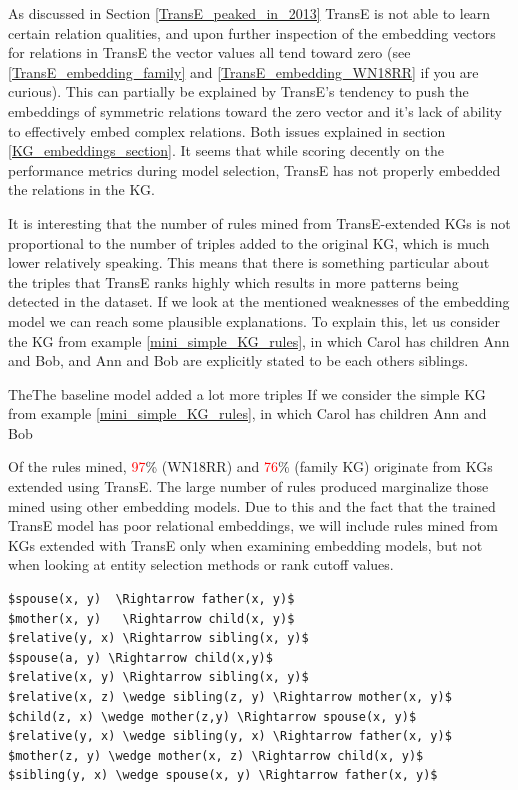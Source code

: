 As discussed in Section \ref{TransE_peaked_in_2013} TransE is not able to learn certain relation qualities, and upon further inspection of the embedding vectors for relations in TransE the vector values all tend toward zero (see \ref{TransE_embedding_family} and \ref{TransE_embedding_WN18RR} if you are curious). This can partially be explained by TransE's tendency to push the embeddings of symmetric relations toward the zero vector and it's lack of ability to effectively embed complex relations. Both issues explained in section \ref{KG_embeddings_section}. It seems that while scoring decently on the performance metrics during model selection, TransE has not properly embedded the relations in the KG. 

It is interesting that the number of rules mined from TransE-extended KGs is not proportional to the number of triples added to the original KG, which is much lower relatively speaking. This means that there is something particular about the triples that TransE ranks highly which results in more patterns being detected in the dataset. If we look at the mentioned weaknesses of the embedding model we can reach some plausible explanations. To explain this, let us consider the KG from example \ref{mini_simple_KG_rules}, in which Carol has children Ann and Bob, and Ann and Bob are explicitly stated to be each others siblings.

TheThe baseline model added a lot more triples  
If we consider the simple KG from example \ref{mini_simple_KG_rules}, in which Carol has children Ann and Bob



Of the rules mined, \textcolor{red}{97}\% (WN18RR) and \textcolor{red}{76}\% (family KG) originate from KGs extended using TransE. The large number of rules produced marginalize those mined using other embedding models. Due to this and the fact that the trained TransE model has poor relational embeddings, we will include rules mined from KGs extended with TransE only when examining embedding models, but not when looking at entity selection methods or rank cutoff values.

\begin{lstlisting}[mathescape=true, float, caption={Selection of nonsense rules mined from KGs extended with TransE.},captionpos=b, label={TransE_nonsense_rules}]
$spouse(x, y)  \Rightarrow father(x, y)$
$mother(x, y)   \Rightarrow child(x, y)$
$relative(y, x) \Rightarrow sibling(x, y)$
$spouse(a, y) \Rightarrow child(x,y)$
$relative(x, y) \Rightarrow sibling(x, y)$
$relative(x, z) \wedge sibling(z, y) \Rightarrow mother(x, y)$
$child(z, x) \wedge mother(z,y) \Rightarrow spouse(x, y)$
$relative(y, x) \wedge sibling(y, x) \Rightarrow father(x, y)$
$mother(z, y) \wedge mother(x, z) \Rightarrow child(x, y)$
$sibling(y, x) \wedge spouse(x, y) \Rightarrow father(x, y)$
\end{lstlisting}






